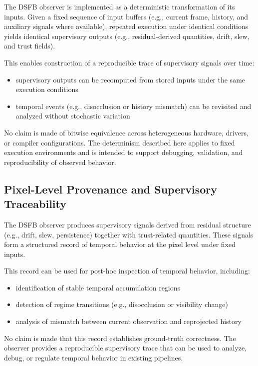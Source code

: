 \documentclass[11pt,letterpaper]{article}
\theoremstyle{gcresult}
\theoremstyle{definition}
\begin{document}
The DSFB observer is implemented as a deterministic transformation of its inputs. Given a fixed sequence of input buffers (e.g., current frame, history, and auxiliary signals where available), repeated execution under identical conditions yields identical supervisory outputs (e.g., residual-derived quantities, drift, slew, and trust fields).

This enables construction of a reproducible trace of supervisory signals over time:
\begin{itemize}
    \item supervisory outputs can be recomputed from stored inputs under the same execution conditions
    \item temporal events (e.g., disocclusion or history mismatch) can be revisited and analyzed without stochastic variation
\end{itemize}

No claim is made of bitwise equivalence across heterogeneous hardware, drivers, or compiler configurations. The determinism described here applies to fixed execution environments and is intended to support debugging, validation, and reproducibility of observed behavior.


\subsection{Pixel-Level Provenance and Supervisory Traceability}

The DSFB observer produces supervisory signals derived from residual structure (e.g., drift, slew, persistence) together with trust-related quantities. These signals form a structured record of temporal behavior at the pixel level under fixed inputs.

This record can be used for post-hoc inspection of temporal behavior, including:
\begin{itemize}
    \item identification of stable temporal accumulation regions
    \item detection of regime transitions (e.g., disocclusion or visibility change)
    \item analysis of mismatch between current observation and reprojected history
\end{itemize}

No claim is made that this record establishes ground-truth correctness. The observer provides a reproducible supervisory trace that can be used to analyze, debug, or regulate temporal behavior in existing pipelines.
\end{document}

